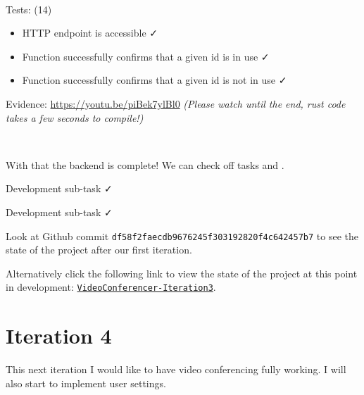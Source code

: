 {\color{gray} \hrulefill} \\ \vspace{0.2cm}

{\sffamily Tests: (14)}

\begin{itemize}
\item HTTP endpoint is accessible \faCheck \\
\item Function successfully confirms that a given id is in use \faCheck \\
\item Function successfully confirms that a given id is not in use \faCheck \\
\end{itemize}

{\sffamily Evidence:} \url{https://youtu.be/piBek7ylBl0}
\textit{(Please watch until the end, rust code takes a
few seconds to compile!)}

{\color{gray} \hrulefill} \\ \vspace{0.2cm}

With that the backend is complete! We can check off tasks 
and .\\ \vspace{0.2cm}

{\sffamily Development sub-task}  \faCheck \\ \vspace{0.2cm}

{\sffamily Development sub-task}  \faCheck \\ \vspace{0.2cm}

Look at Github commit
\texttt{df58f2faecdb9676245f303192820f4c642457b7} to see the
state of the project after our first iteration. \\
\vspace{0.2cm}

Alternatively click the following link to view the state
of the project at this point in development:
\href{https://github.com/zzzNathan/Video-Conferencer/tree/df58f2faecdb9676245f303192820f4c642457b7}{\texttt{VideoConferencer-Iteration3}}.

\section{Iteration 4}

This next iteration I would like to have video conferencing
fully working. I will also start to implement user settings.
\\ \vspace{0.2cm}

